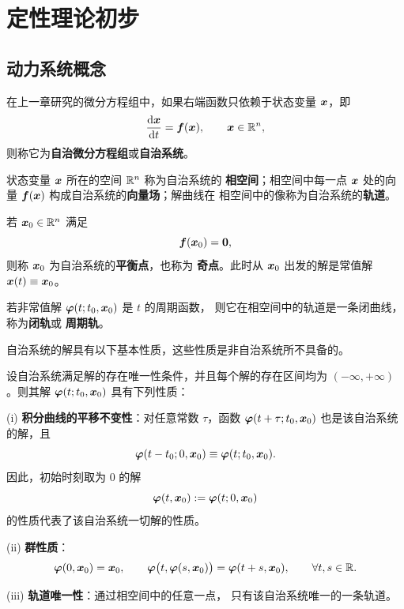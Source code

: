 \setchapterintro{}
\chapter{定性理论初步}\label{chap:qualitative}

\section{动力系统概念}\label{sec:动力系统概念}

在上一章研究的微分方程组中，如果右端函数只依赖于状态变量
$\boldsymbol{x}$，即
\[
	\dfrac{\mathrm{d}\boldsymbol{x}}{\mathrm{d} t}=\boldsymbol{f}(\boldsymbol{x}),
	\qquad \boldsymbol{x}\in\mathbb{R}^n,
\]
则称它为\textbf{自治微分方程组}或\textbf{自治系统}。

\begin{definition}\label{def:相空间向量场与轨道}
	状态变量 $\boldsymbol{x}$ 所在的空间 $\mathbb{R}^n$ 称为自治系统的
	\textbf{相空间}；相空间中每一点 $\boldsymbol{x}$ 处的向量
	$\boldsymbol{f}(\boldsymbol{x})$ 构成自治系统的\textbf{向量场}；解曲线在
	相空间中的像称为自治系统的\textbf{轨道}。
\end{definition}

\begin{definition}\label{def:平衡点与闭轨}
	若 $\boldsymbol{x}_0\in\mathbb{R}^n$ 满足
	\[
		\boldsymbol{f}(\boldsymbol{x}_0)=\boldsymbol{0},
	\]
	则称 $\boldsymbol{x}_0$ 为自治系统的\textbf{平衡点}，也称为
	\textbf{奇点}。此时从 $\boldsymbol{x}_0$ 出发的解是常值解
	$\boldsymbol{x}(t)\equiv\boldsymbol{x}_0$。

	若非常值解 $\boldsymbol{\varphi}(t;t_0,\boldsymbol{x}_0)$ 是 $t$ 的周期函数，
	则它在相空间中的轨道是一条闭曲线，称为\textbf{闭轨}或
	\textbf{周期轨}。
\end{definition}

自治系统的解具有以下基本性质，这些性质是非自治系统所不具备的。

\begin{proposition}\label{thm:自治系统解的基本性质}
	设自治系统满足解的存在唯一性条件，并且每个解的存在区间均为
	$(-\infty,+\infty)$。则其解
	$\boldsymbol{\varphi}(t;t_0,\boldsymbol{x}_0)$ 具有下列性质：

	\textnormal{(i)} \textbf{积分曲线的平移不变性}：对任意常数
	$\tau$，函数
	$\boldsymbol{\varphi}(t+\tau;t_0,\boldsymbol{x}_0)$ 也是该自治系统的解，且
	\[
		\boldsymbol{\varphi}(t-t_0;0,\boldsymbol{x}_0)
		\equiv\boldsymbol{\varphi}(t;t_0,\boldsymbol{x}_0).
	\]
	因此，初始时刻取为 $0$ 的解
	\[
		\boldsymbol{\varphi}(t,\boldsymbol{x}_0)
		\mathrel{:=}\boldsymbol{\varphi}(t;0,\boldsymbol{x}_0)
	\]
	的性质代表了该自治系统一切解的性质。

	\textnormal{(ii)} \textbf{群性质}：
	\[
		\boldsymbol{\varphi}(0,\boldsymbol{x}_0)=\boldsymbol{x}_0,
		\qquad
		\boldsymbol{\varphi}\bigl(t,\boldsymbol{\varphi}(s,\boldsymbol{x}_0)\bigr)
		=\boldsymbol{\varphi}(t+s,\boldsymbol{x}_0),
		\qquad \forall t,s\in\mathbb{R}.
	\]

	\textnormal{(iii)} \textbf{轨道唯一性}：通过相空间中的任意一点，
	只有该自治系统唯一的一条轨道。
\end{proposition}

